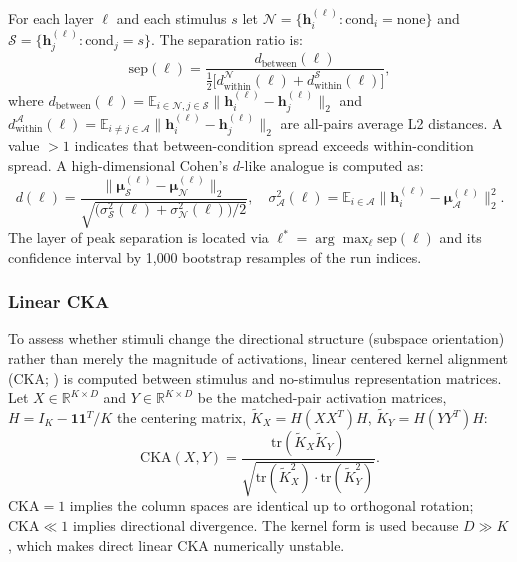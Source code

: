 \documentclass[14pt,a4paper]{extarticle}
\let\cite\squarecite
\begin{document}
For each layer $\ell$ and each stimulus $s$ let $\mathcal{N} = \{\mathbf{h}^{(\ell)}_i : \text{cond}_i = \text{none}\}$ and $\mathcal{S} = \{\mathbf{h}^{(\ell)}_j : \text{cond}_j = s\}$. The separation ratio is:
\begin{equation}
\mathrm{sep}(\ell) = \frac{d_{\mathrm{between}}(\ell)}{\tfrac{1}{2}\bigl[d_{\mathrm{within}}^{\mathcal{N}}(\ell) + d_{\mathrm{within}}^{\mathcal{S}}(\ell)\bigr]},
\label{eq:sep}
\end{equation}
where $d_{\mathrm{between}}(\ell) = \mathbb{E}_{i \in \mathcal{N}, j \in \mathcal{S}}\|\mathbf{h}^{(\ell)}_i - \mathbf{h}^{(\ell)}_j\|_2$ and $d_{\mathrm{within}}^{\mathcal{A}}(\ell) = \mathbb{E}_{i \neq j \in \mathcal{A}}\|\mathbf{h}^{(\ell)}_i - \mathbf{h}^{(\ell)}_j\|_2$ are all-pairs average L2 distances. A value $>1$ indicates that between-condition spread exceeds within-condition spread. A high-dimensional Cohen's $d$-like analogue is computed as:
\begin{equation}
d(\ell) = \frac{\|\boldsymbol{\mu}_{\mathcal{S}}^{(\ell)} - \boldsymbol{\mu}_{\mathcal{N}}^{(\ell)}\|_2}{\sqrt{\bigl(\sigma^2_{\mathcal{S}}(\ell) + \sigma^2_{\mathcal{N}}(\ell)\bigr)/2}}, \quad \sigma^2_{\mathcal{A}}(\ell) = \mathbb{E}_{i \in \mathcal{A}}\|\mathbf{h}^{(\ell)}_i - \boldsymbol{\mu}_{\mathcal{A}}^{(\ell)}\|_2^2.
\label{eq:cohend}
\end{equation}
The layer of peak separation is located via $\ell^* = \arg\max_\ell \mathrm{sep}(\ell)$ and its confidence interval by 1{,}000 bootstrap resamples of the run indices.

\subsubsection*{Linear CKA}

To assess whether stimuli change the directional structure (subspace orientation) rather than merely the magnitude of activations, linear centered kernel alignment (CKA; \cite{kornblith2019}) is computed between stimulus and no-stimulus representation matrices. Let $X \in \mathbb{R}^{K \times D}$ and $Y \in \mathbb{R}^{K \times D}$ be the matched-pair activation matrices, $H = I_K - \mathbf{1}\mathbf{1}^T/K$ the centering matrix, $\widetilde{K}_X = H(XX^T)H$, $\widetilde{K}_Y = H(YY^T)H$:
\begin{equation}
\mathrm{CKA}(X, Y) = \frac{\mathrm{tr}(\widetilde{K}_X \widetilde{K}_Y)}{\sqrt{\mathrm{tr}(\widetilde{K}_X^2)\cdot\mathrm{tr}(\widetilde{K}_Y^2)}}.
\label{eq:cka}
\end{equation}
$\mathrm{CKA} = 1$ implies the column spaces are identical up to orthogonal rotation; $\mathrm{CKA} \ll 1$ implies directional divergence. The kernel form is used because $D \gg K$, which makes direct linear CKA numerically unstable.
\end{document}
